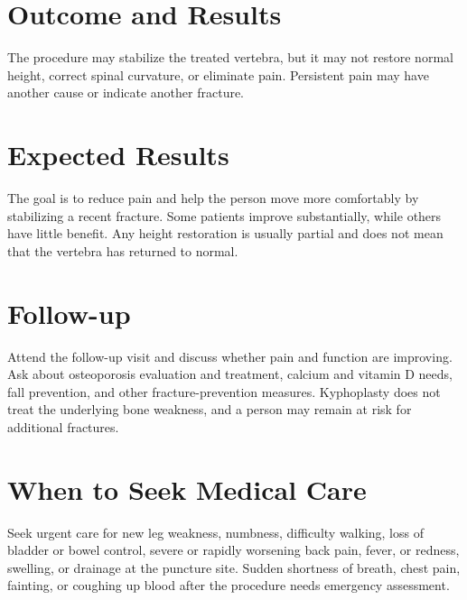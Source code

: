 \section*{Outcome and Results}
The procedure may stabilize the treated vertebra, but it may not restore normal height, correct spinal curvature, or eliminate pain. Persistent pain may have another cause or indicate another fracture.

\section*{Expected Results}
The goal is to reduce pain and help the person move more comfortably by stabilizing a recent fracture. Some patients improve substantially, while others have little benefit. Any height restoration is usually partial and does not mean that the vertebra has returned to normal.

\section*{Follow-up}
Attend the follow-up visit and discuss whether pain and function are improving. Ask about osteoporosis evaluation and treatment, calcium and vitamin D needs, fall prevention, and other fracture-prevention measures. Kyphoplasty does not treat the underlying bone weakness, and a person may remain at risk for additional fractures.

\section*{When to Seek Medical Care}
Seek urgent care for new leg weakness, numbness, difficulty walking, loss of bladder or bowel control, severe or rapidly worsening back pain, fever, or redness, swelling, or drainage at the puncture site. Sudden shortness of breath, chest pain, fainting, or coughing up blood after the procedure needs emergency assessment.

